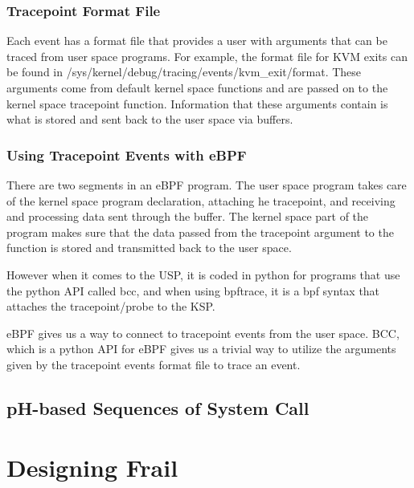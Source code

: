 \documentclass{report}
\begin{document}
\begin{spacing}{1.5}
\subsection{Tracepoint Format File}

{\large
Each event has a format file that provides a user with arguments that can be traced from user space programs. For example, the format file for KVM exits can be found in /sys/kernel/debug/tracing/events/kvm\_exit/format. These arguments come from default kernel space functions and are passed on to the kernel space tracepoint function. Information that these arguments contain is what is stored and sent back to the user space via buffers.
\newline
}


\subsection{Using Tracepoint Events with eBPF}
{\large
There are two segments in an eBPF program. The user space program takes care of the kernel space program declaration, attaching he tracepoint, and receiving and processing data sent through the buffer. The kernel space part of the program makes sure that the data passed from the tracepoint argument to the function is stored and transmitted back to the user space.

However when it comes to the USP, it is coded in python for programs that use the python API called bcc, and when using bpftrace, it is a bpf syntax that attaches the tracepoint/probe to the KSP.








eBPF gives us a way to connect to tracepoint events from the user space. BCC, which is a python API for eBPF gives us a trivial way to utilize the arguments given by the tracepoint events format file to trace an event. 
\leavevmode\newline
}



\section{pH-based Sequences of System Call}



\chapter{Designing Frail}


\end{spacing}
\end{document}
